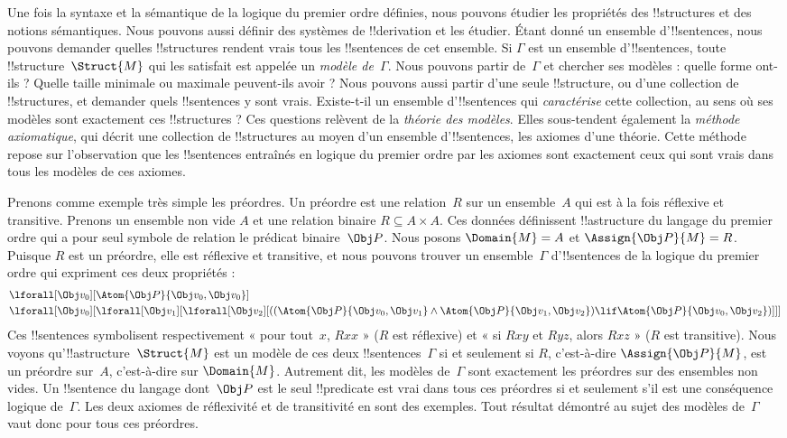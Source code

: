 \documentclass[../../../include/open-logic-section]{subfiles}
\begin{document}


Une fois la syntaxe et la sémantique de la logique du premier ordre
définies, nous pouvons étudier les propriétés des !!{structure}s et des
notions sémantiques. Nous pouvons aussi définir des systèmes de
!!{derivation} et les étudier. Étant donné un ensemble
d'!!{sentence}s, nous pouvons demander quelles !!{structure}s rendent
vrais tous les !!{sentence}s de cet ensemble. Si $\Gamma$ est un
ensemble d'!!{sentence}s, toute !!{structure}~$\Struct{M}$ qui les
satisfait est appelée un \emph{modèle de~$\Gamma$}. Nous pouvons partir
de~$\Gamma$ et chercher ses modèles : quelle forme ont-ils ? Quelle
taille minimale ou maximale peuvent-ils avoir ? Nous pouvons aussi
partir d'une seule !!{structure}, ou d'une collection de
!!{structure}s, et demander quels !!{sentence}s y sont vrais.
Existe-t-il un ensemble d'!!{sentence}s qui \emph{caractérise} cette
collection, au sens où ses modèles sont exactement ces
!!{structure}s ? Ces questions relèvent de la \emph{théorie des
modèles}. Elles sous-tendent également la \emph{méthode axiomatique},
qui décrit une collection de !!{structure}s au moyen d'un ensemble
d'!!{sentence}s, les axiomes d'une théorie. Cette méthode repose sur
l'observation que les !!{sentence}s entraînés en logique du premier
ordre par les axiomes sont exactement ceux qui sont vrais dans tous les
modèles de ces axiomes.

Prenons comme exemple très simple les préordres. Un préordre est une
relation~$R$ sur un ensemble~$A$ qui est à la fois réflexive et
transitive. Prenons un ensemble non vide $A$ et une relation binaire
$R \subseteq A \times A$. Ces données définissent !!a{structure}
du langage du premier ordre qui a pour seul symbole de relation
le prédicat binaire~$\Obj P$. Nous posons $\Domain{M} = A$
et $\Assign{\Obj P}{M} = R$. Puisque $R$ est un
préordre, elle est réflexive et transitive, et nous pouvons trouver un
ensemble~$\Gamma$ d'!!{sentence}s de la logique du premier ordre qui
expriment ces deux propriétés :
\begin{align*}
  & \lforall[\Obj v_0][\Atom{\Obj P}{\Obj v_0,\Obj v_0}]\\
  & \lforall[\Obj v_0][\lforall[\Obj v_1][\lforall[\Obj v_2]
    [((\Atom{\Obj P}{\Obj v_0,\Obj v_1} \land
       \Atom{\Obj P}{\Obj v_1,\Obj v_2})
      \lif \Atom{\Obj P}{\Obj v_0,\Obj v_2})]]]
\end{align*}
Ces !!{sentence}s symbolisent respectivement « pour tout~$x$, $Rxx$ »
($R$ est réflexive) et « si $Rxy$ et $Ryz$, alors $Rxz$ » ($R$ est
transitive). Nous voyons qu'!!a{structure}~$\Struct{M}$ est un modèle
de ces deux !!{sentence}s~$\Gamma$ si et seulement si $R$, c'est-à-dire
$\Assign{\Obj P}{M}$, est un préordre sur~$A$, c'est-à-dire sur
$\Domain{M}$. Autrement dit, les modèles de~$\Gamma$ sont exactement
les préordres sur des ensembles non vides. Un !!{sentence} du langage
dont~$\Obj P$ est le seul !!{predicate} est vrai dans tous ces
préordres si et seulement s'il
est une conséquence logique de~$\Gamma$. Les deux axiomes de
réflexivité et de transitivité en sont des exemples. Tout résultat
démontré au sujet des modèles de~$\Gamma$ vaut donc pour tous ces
préordres.
\end{document}
